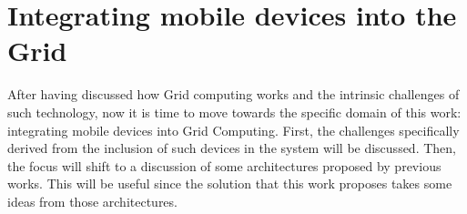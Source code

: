 \chapter{Integrating mobile devices into the Grid}\label{integrating_mobile_devices_into_the_grid}
After having discussed how Grid computing works and the intrinsic challenges of such technology, now it is time to move towards the specific domain of this work: integrating mobile devices into Grid Computing. First, the challenges specifically derived from the inclusion of such devices in the system will be discussed. Then, the focus will shift to a discussion of some architectures proposed by previous works. This will be useful since the solution that this work proposes takes some ideas from those architectures.


